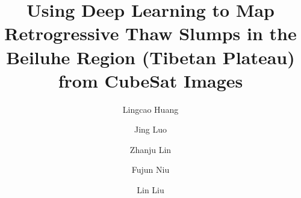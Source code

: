 \documentclass[authoryear,preprint,review,12pt]{elsarticle}
\begin{document}
\begin{frontmatter}




\title{Using Deep Learning to Map Retrogressive Thaw Slumps in the Beiluhe Region (Tibetan Plateau) from CubeSat Images}



\author[a]{Lingcao Huang}
\author[b]{Jing Luo}
\author[b]{Zhanju Lin}
\author[b]{Fujun Niu}
\author[a]{Lin Liu}


\address[a]{Earth System Science Programme, Faculty of Science, The Chinese University of Hong Kong, Hong Kong SAR, China.}
\address[b]{Northwest Institute of Eco-Environment and Resources, Chinese Academy of Sciences, Lanzhou, China.}

\begin{abstract}


\end{abstract}
\end{frontmatter}
\end{document}
